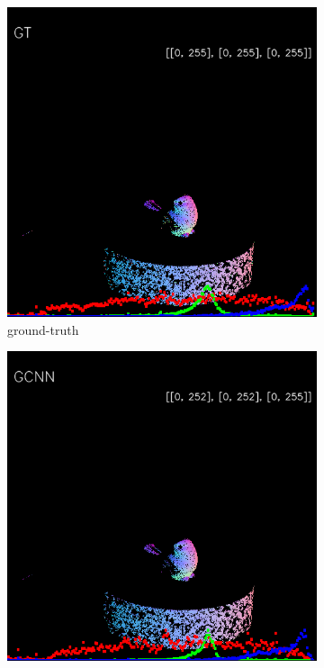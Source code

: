 \begin{figure}[h!]
\begin{subfigure}[b]{0.24\linewidth}
		\includegraphics[width=\linewidth]{./Figures/gcnn-real/fancy_eval_1_groundtruth.png}
		\caption{ground-truth}
	\end{subfigure}
	\begin{subfigure}[b]{0.24\linewidth}
		\includegraphics[width=\linewidth]{./Figures/gcnn-real/fancy_eval_1_normal_GCNN.png}

\end{subfigure}
\end{figure}
